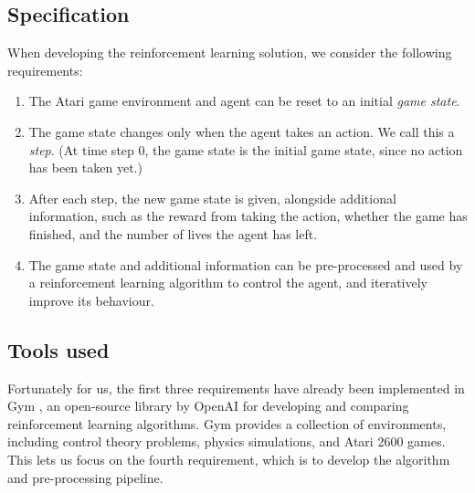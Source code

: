\documentclass[12pt,a4paper]{article}
\begin{document}
\subsection{Specification}
When developing the reinforcement learning solution, we consider the following requirements:
\begin{enumerate}
    \item The Atari game environment and agent can be reset to an initial \emph{game state}. 
    \item The game state changes only when the agent takes an action. We call this a \emph{step}. (At time step 0, the game state is the initial game state, since no action has been taken yet.)
    \item After each step, the new game state is given, alongside additional information, such as the reward from taking the action, whether the game has finished, and the number of lives the agent has left. 
    \item The game state and additional information can be pre-processed and used by a reinforcement learning algorithm to control the agent, and iteratively improve its behaviour.
\end{enumerate}



\subsection{Tools used}
Fortunately for us, the first three requirements have already been implemented in Gym \cite{1606.01540}, an open-source library by OpenAI for developing and comparing reinforcement learning algorithms. Gym provides a collection of environments, including control theory problems, physics simulations, and Atari 2600 games. This lets us focus on the fourth requirement, which is to develop the algorithm and pre-processing pipeline.
\end{document}
